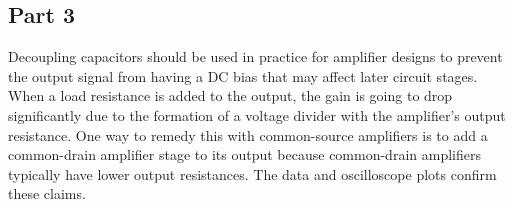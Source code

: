 \subsection{Part 3}
Decoupling capacitors should be used in practice for amplifier designs to prevent the output signal from having a DC bias that may affect later circuit stages.
When a load resistance is added to the output, the gain is going to drop significantly due to the formation of a voltage divider with the amplifier's output resistance.
One way to remedy this with common-source amplifiers is to add a common-drain amplifier stage to its output because common-drain amplifiers typically have lower output resistances.
The data and oscilloscope plots confirm these claims.
